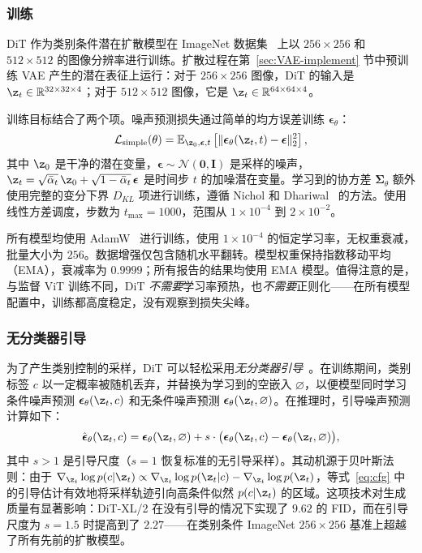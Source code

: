\documentclass[../../book-main_zh.tex]{subfiles}
\begin{document}
\subsubsection{训练}
DiT 作为类别条件潜在扩散模型在 ImageNet 数据集~\citep{deng2009imagenet} 上以 $256 \times 256$ 和 $512 \times 512$ 的图像分辨率进行训练。扩散过程在第~\ref{sec:VAE-implement} 节中预训练 VAE 产生的潜在表征上运行：对于 $256 \times 256$ 图像，DiT 的输入是 $\z_t \in \mathbb{R}^{32 \times 32 \times 4}$；对于 $512 \times 512$ 图像，它是 $\z_t \in \mathbb{R}^{64 \times 64 \times 4}$。

训练目标结合了两个项。噪声预测损失通过简单的均方误差训练 $\boldsymbol{\epsilon}_\theta$：
\begin{equation}
    \mathcal{L}_{\mathrm{simple}}(\theta) = \mathbb{E}_{\z_0, \boldsymbol{\epsilon}, t}\left[\|\boldsymbol{\epsilon}_\theta(\z_t, t) - \boldsymbol{\epsilon}\|_2^2\right],
\end{equation}
其中 $\z_0$ 是干净的潜在变量，$\boldsymbol{\epsilon} \sim \mathcal{N}(\boldsymbol{0}, \boldsymbol{I})$ 是采样的噪声，$\z_t = \sqrt{\bar{\alpha}_t}\,\z_0 + \sqrt{1 - \bar{\alpha}_t}\,\boldsymbol{\epsilon}$ 是时间步 $t$ 的加噪潜在变量。学习到的协方差 $\boldsymbol{\Sigma}_\theta$ 额外使用完整的变分下界 $D_{KL}$ 项进行训练，遵循 Nichol 和 Dhariwal~\citep{nichol2021improved} 的方法。使用线性方差调度，步数为 $t_{\max} = 1000$，范围从 $1 \times 10^{-4}$ 到 $2 \times 10^{-2}$。

所有模型均使用 AdamW~\citep{loshchilov2019decoupled} 进行训练，使用 $1 \times 10^{-4}$ 的恒定学习率，无权重衰减，批量大小为 $256$。数据增强仅包含随机水平翻转。模型权重保持指数移动平均（EMA），衰减率为 $0.9999$；所有报告的结果均使用 EMA 模型。值得注意的是，与监督 ViT 训练不同，DiT \emph{不需要}学习率预热，也\emph{不需要}正则化——在所有模型配置中，训练都高度稳定，没有观察到损失尖峰。

\subsubsection{无分类器引导}
为了产生类别控制的采样，DiT 可以轻松采用\emph{无分类器引导}~\citep{ho2022classifier}。在训练期间，类别标签 $c$ 以一定概率被随机丢弃，并替换为学习到的空嵌入 $\varnothing$，以便模型同时学习条件噪声预测 $\boldsymbol{\epsilon}_\theta(\z_t, c)$ 和无条件噪声预测 $\boldsymbol{\epsilon}_\theta(\z_t, \varnothing)$。在推理时，引导噪声预测计算如下：
\begin{equation}
    \hat{\boldsymbol{\epsilon}}_\theta(\z_t, c) = \boldsymbol{\epsilon}_\theta(\z_t, \varnothing) + s \cdot \big(\boldsymbol{\epsilon}_\theta(\z_t, c) - \boldsymbol{\epsilon}_\theta(\z_t, \varnothing)\big),
    \label{eq:cfg}
\end{equation}
其中 $s > 1$ 是引导尺度（$s = 1$ 恢复标准的无引导采样）。其动机源于贝叶斯法则：由于 $\nabla_{\z_t} \log p(c | \z_t) \propto \nabla_{\z_t} \log p(\z_t | c) - \nabla_{\z_t} \log p(\z_t)$，等式~\eqref{eq:cfg} 中的引导估计有效地将采样轨迹引向高条件似然 $p(c | \z_t)$ 的区域。这项技术对生成质量有显著影响：DiT-XL/2 在没有引导的情况下实现了 $9.62$ 的 FID，而在引导尺度为 $s = 1.5$ 时提高到了 $2.27$——在类别条件 ImageNet $256 \times 256$ 基准上超越了所有先前的扩散模型。
\end{document}
